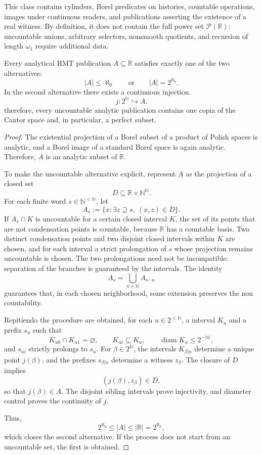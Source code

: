 This class contains cylinders, Borel predicates on histories, countable
operations, images under continuous readers, and publications asserting the
existence of a real witness. By definition, it does not contain the full power set
\(\mathcal P(\mathbb R)\): uncountable unions, arbitrary selectors, nonsmooth quotients, and
recursion of length \(\omega_1\) require additional data.

\begin{theorem}
\label{p12-83-c19-s1:hmtch:thm-dicotomia-perfecta}
Every analytical HMT publication \(A\subseteq\mathbb R\) satisfies exactly
one of the two alternatives:
\[
 |A|\leq\aleph_0
 \qquad\text{or}\qquad
 |A|=2^{\aleph_0}.
\]
In the second alternative there exists a continuous injection.
\[
 j:2^{\mathbb N}\hookrightarrow A.
\]
therefore, every uncountable analytic publication contains one copia of the
Cantor space and, in particular, a perfect subset.
\end{theorem}

\begin{proof}
The existential projection of a Borel subset of a product of Polish spaces is analytic, and a Borel image of a standard Borel space is again analytic. Therefore, \(A\) is an analytic subset of
\(\mathbb R\).

To make the uncountable alternative explicit, represent \(A\) as
the projection of a closed set
\[
 D\subseteq\mathbb R\times\mathbb N^{\mathbb N}.
\]
For each finite word \(s\in\mathbb N^{<\mathbb N}\), let
\[
 A_s:=\{x:\exists z\supseteq s,\ (x,z)\in D\}.
\]
If \(A_s\cap K\) is uncountable for a certain closed interval \(K\), the set of its points that are not condensation points is countable, because \(\mathbb R\) has a countable basis. Two distinct condensation points and two disjoint closed intervals within \(K\) are chosen, and for each interval a strict prolongation of \(s\) whose projection remains uncountable is chosen. The two prolongations need not be incompatible: separation of the branches is guaranteed by the intervals. The identity
\[
 A_s=\bigcup_{n\in\mathbb N}A_{s^\frown n}
\]
guarantees that, in each chosen neighborhood, some extension preserves the non
countability.

Repitiendo the procedure are obtained, for each
\(u\in2^{<\mathbb N}\), a interval \(K_u\) and a prefix \(s_u\) such that
\[
 K_{u0}\cap K_{u1}=\varnothing,
 \qquad
 K_{ui}\subseteq K_u,
 \qquad
 \operatorname{diam}K_u\leq2^{-|u|},
\]
and \(s_{ui}\) strictly prolongs to \(s_u\). For
\(\beta\in2^{\mathbb N}\), the intervals
\(K_{\beta|n}\) determine a unique point \(j(\beta)\), and the prefixes
\(s_{\beta|n}\) determine a witness \(z_\beta\). The closure of \(D\)
implies
\[
 (j(\beta),z_\beta)\in D,
\]
so that \(j(\beta)\in A\). The disjoint sibling intervals prove
injectivity, and diameter control proves the continuity of \(j\).

Thus,
\[
 2^{\aleph_0}\leq |A|\leq|\mathbb R|=2^{\aleph_0},
\]
which closes the second alternative. If the process does not start from an
uncountable set, the first is obtained.
\end{proof}


